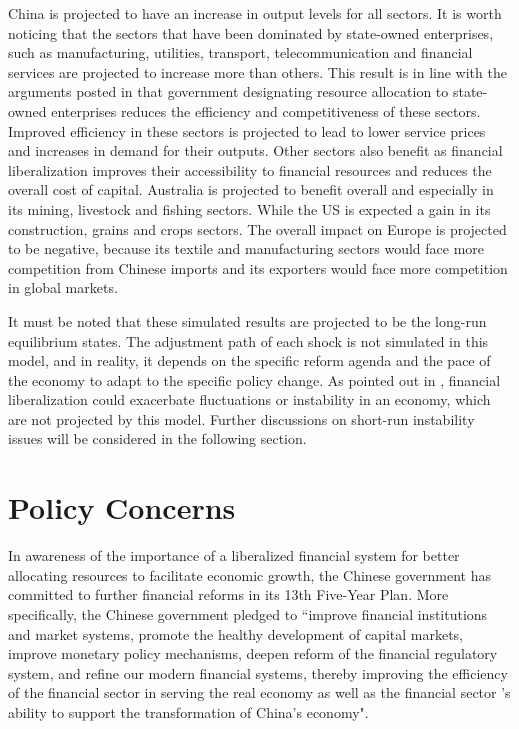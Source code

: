 \documentclass[AER]{AEA}
\begin{document}
China is projected to have an increase in output levels for all sectors. 
It is worth noticing that the sectors that have been dominated by state-owned 
enterprises, such as manufacturing, utilities, transport, telecommunication and 
financial services are projected to increase more than others. This result is 
in line with the arguments posted in  that government 
designating resource allocation to state-owned enterprises reduces the 
efficiency and competitiveness of these sectors. 
Improved efficiency in these sectors is projected to lead to lower service 
prices and increases in demand for their outputs.
Other sectors also benefit as financial liberalization 
improves their accessibility to financial resources and reduces the overall 
cost of capital. Australia is projected to benefit overall and especially 
in its mining, livestock and fishing sectors. While the US is expected a gain 
in its construction, grains and crops sectors. The overall impact on Europe 
is projected to be negative, because its textile and manufacturing sectors 
would face more competition from Chinese imports and its exporters would 
face more competition in global markets.

It must be noted that these simulated results are projected to be the long-run 
equilibrium states. The adjustment path of each shock is not simulated in 
this model, and in reality, it depends on the specific reform agenda and 
the pace of the economy to adapt to the specific policy change. 
As pointed out in , financial liberalization could 
exacerbate fluctuations or instability in an economy, which are not projected 
by this model. Further discussions on short-run instability issues will be 
considered in the following section.\\

\section{Policy Concerns}
\label{sec:policy}

In awareness of the importance of a liberalized financial system for better 
allocating resources to facilitate economic growth, the Chinese government 
has committed to further financial reforms in its 13th Five-Year Plan.
More specifically, the Chinese government pledged to
``improve financial institutions and market systems, promote the healthy
development of capital markets, improve monetary policy mechanisms, deepen reform
of the financial regulatory system, and refine our modern financial systems, thereby
improving the efficiency of the financial sector in serving the real economy 
as well as the financial sector ’s ability to support the transformation 
of China’s economy"\footnotemark[5].
\end{document}
